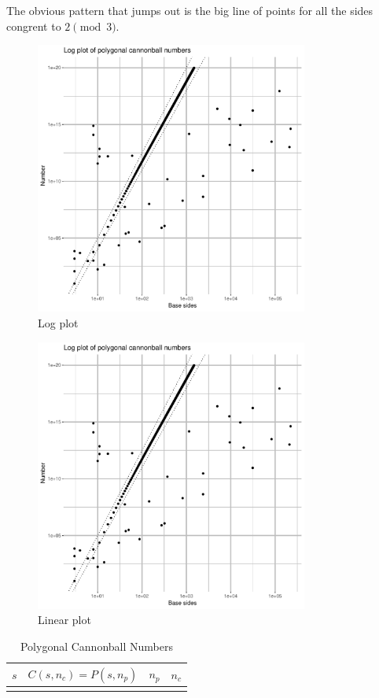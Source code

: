 \documentclass[fleqn,a4paper,11pt]{article}
\begin{document}
The obvious pattern that jumps out is the big line of points for all the sides
congrent to \(2 \pmod 3\).

\begin{figure}[H]
\centering
\includegraphics[width=0.8\textwidth,page=1]{../graph/Rplots.pdf}
\caption{Log plot}
\label{fig_log}
\end{figure}

\begin{figure}[H]
\centering
\includegraphics[width=0.8\textwidth,page=2]{../graph/Rplots.pdf}
\caption{Linear plot}
\label{fig_lin}
\end{figure}

\begin{longtable}{*4r}
\toprule
\boldmath \(s\) & \boldmath \(C(s, n_c) = P(s, n_p)\)
& \boldmath \(n_p\) & \boldmath \(n_c\) \\
\midrule
\endhead

\bottomrule
\caption{Polygonal Cannonball Numbers}
\label{tab_ugly}
\end{longtable}
\end{document}
